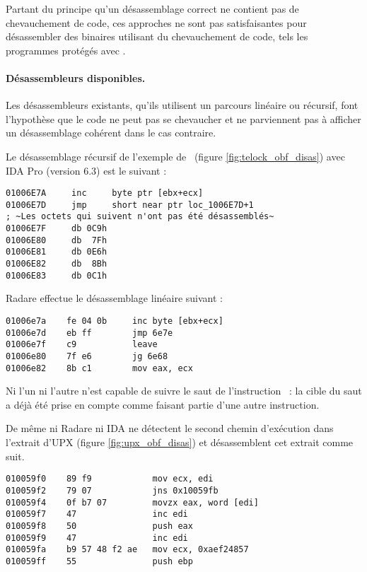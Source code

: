 Partant du principe qu'un désassemblage correct ne contient pas de chevauchement de code, ces approches ne sont pas satisfaisantes pour désassembler des binaires utilisant du chevauchement de code, tels les programmes protégés avec \telock.


\paragraph{Désassembleurs disponibles.}
Les désassembleurs existants, qu'ils utilisent un parcours linéaire ou récursif, font l'hypothèse que le code ne peut pas se chevaucher et ne parviennent pas à afficher un désassemblage cohérent dans le cas contraire.

Le désassemblage récursif de l'exemple de \telock\ (figure \ref{fig:telock_obf_disas}) avec IDA Pro (version 6.3) \cite{IDA} est le suivant :
\begin{lstlisting}[language={[x86masm]Assembler}, escapechar=~]
01006E7A     inc     byte ptr [ebx+ecx]
01006E7D     jmp     short near ptr loc_1006E7D+1
; ~Les octets qui suivent n'ont pas été désassemblés~
01006E7F     db 0C9h
01006E80     db  7Fh
01006E81     db 0E6h
01006E82     db  8Bh
01006E83     db 0C1h
\end{lstlisting}
Radare \cite{radare} effectue le désassemblage linéaire suivant :
\begin{lstlisting}[language={[x86masm]Assembler}, escapechar=~]
01006e7a    fe 04 0b     inc byte [ebx+ecx]
01006e7d    eb ff        jmp 6e7e
01006e7f    c9           leave
01006e80    7f e6        jg 6e68
01006e82    8b c1        mov eax, ecx
\end{lstlisting}
Ni l'un ni l'autre n'est capable de suivre le saut de l'instruction \jmp\ : la cible du saut a déjà été prise en compte comme faisant partie d'une autre instruction.

De même ni Radare ni IDA ne détectent le second chemin d'exécution dans l'extrait d'UPX (figure \ref{fig:upx_obf_disas}) et désassemblent cet extrait comme suit.
\begin{lstlisting}[language={[x86masm]Assembler}, escapechar=~]
010059f0    89 f9            mov ecx, edi
010059f2    79 07            jns 0x10059fb
010059f4    0f b7 07         movzx eax, word [edi]
010059f7    47               inc edi
010059f8    50               push eax
010059f9    47               inc edi
010059fa    b9 57 48 f2 ae   mov ecx, 0xaef24857
010059ff    55               push ebp
\end{lstlisting}

